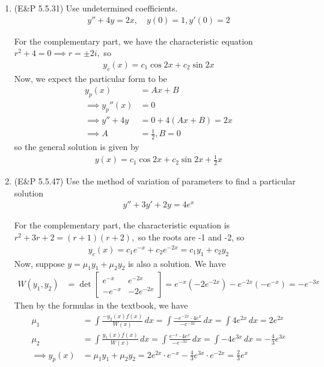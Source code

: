 \documentclass{article}
\begin{document}
\begin{enumerate}
	\item (E\&P 5.5.31) Use undetermined coefficients.
		\begin{align*}
			y''+4y=2x, \quad y(0)=1, y'(0)=2
		\end{align*}
		\begin{soln}
			For the complementary part, we have the characteristic equation $r^2+4=0\implies r=\pm 2i,$ so
			\begin{align*}
				y_c(x) = c_1\cos 2x + c_2\sin 2x
			\end{align*}
			Now, we expect the particular form to be
			\begin{align*}
				y_p(x) &= Ax+B \\
				\implies y_p''(x) &= 0 \\
				\implies y'' + 4y &= 0 + 4(Ax+B) = 2x \\
				\implies A &= \frac{1}{2}, B = 0
			\end{align*}
			so the general solution is given by
			\begin{align*}
				y(x) = c_1\cos 2x + c_2\sin 2x + \frac{1}{2}x
			\end{align*}
		\end{soln}

	\item (E\&P 5.5.47) Use the method of variation of parameters to find a particular solution
		\begin{align*}
			y'' + 3y' + 2y = 4e^x
		\end{align*}
		\begin{soln}
			For the complementary part, the characteristic equation is $r^2+3r+2=(r+1)(r+2),$ so the roots are -1 and -2, so
			\begin{align*}
				y_c(x) = c_1e^{-x} + c_2e^{-2x} = c_1y_1 + c_2y_2
			\end{align*}
			Now, suppose $y = \mu_1y_1 + \mu_2y_2$ is also a solution. We have
			\begin{align*}
				W(y_1, y_2) &= \det \begin{bmatrix}
					e^{-x} & e^{-2x} \\ -e^{-x} & -2e^{-2x}
				\end{bmatrix} = e^{-x}(-2e^{-2x}) - e^{-2x}(-e^{-x}) = -e^{-3x}
			\end{align*}
			Then by the formulas in the textbook, we have
			\begin{align*}
				\mu_1 &= \int \frac{-y_2(x) f(x)}{W(x)}\, dx = \int \frac{-e^{-2x} \cdot 4e^x}{-e^{-3x}}\, dx = \int 4e^{2x}\, dx = 2e^{2x} \\
				\mu_2 &= \int \frac{y_1(x)f(x)}{W(x)}\, dx = \int \frac{e^{-x}\cdot 4e^{x}}{-e^{-3x}}\, dx = \int -4e^{3x}\, dx = -\frac{4}{3} e^{3x} \\
				\implies y_p(x) &= \mu_1 y_1 + \mu_2y_2 = 2e^{2x} \cdot e^{-x} - \frac{4}{3}e^{3x}\cdot e^{-2x} = \frac{2}{3} e^x
			\end{align*}
		\end{soln}


\end{enumerate}
\end{document}

